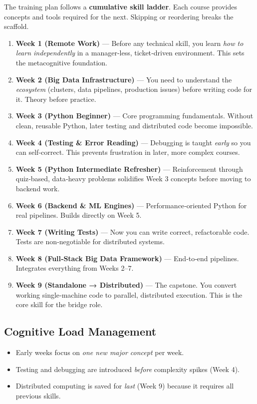 \documentclass[12pt]{article}
\begin{document}
	The training plan follows a \textbf{cumulative skill ladder}. Each course provides concepts and tools required for the next. Skipping or reordering breaks the scaffold.
	
	\begin{enumerate}
		\item \textbf{Week 1 (Remote Work)} — Before any technical skill, you learn \emph{how to learn independently} in a manager‑less, ticket‑driven environment. This sets the metacognitive foundation.
		
		\item \textbf{Week 2 (Big Data Infrastructure)} — You need to understand the \emph{ecosystem} (clusters, data pipelines, production issues) before writing code for it. Theory before practice.
		
		\item \textbf{Week 3 (Python Beginner)} — Core programming fundamentals. Without clean, reusable Python, later testing and distributed code become impossible.
		
		\item \textbf{Week 4 (Testing \& Error Reading)} — Debugging is taught \emph{early} so you can self‑correct. This prevents frustration in later, more complex courses.
		
		\item \textbf{Week 5 (Python Intermediate Refresher)} — Reinforcement through quiz‑based, data‑heavy problems solidifies Week 3 concepts before moving to backend work.
		
		\item \textbf{Week 6 (Backend \& ML Engines)} — Performance‑oriented Python for real pipelines. Builds directly on Week 5.
		
		\item \textbf{Week 7 (Writing Tests)} — Now you can write correct, refactorable code. Tests are non‑negotiable for distributed systems.
		
		\item \textbf{Week 8 (Full‑Stack Big Data Framework)} — End‑to‑end pipelines. Integrates everything from Weeks 2–7.
		
		\item \textbf{Week 9 (Standalone → Distributed)} — The capstone. You convert working single‑machine code to parallel, distributed execution. This is the core skill for the bridge role.
	\end{enumerate}
	
	\subsection*{Cognitive Load Management}
	\begin{itemize}
		\item Early weeks focus on \emph{one new major concept} per week.
		\item Testing and debugging are introduced \emph{before} complexity spikes (Week 4).
		\item Distributed computing is saved for \emph{last} (Week 9) because it requires all previous skills.
	\end{itemize}
	
\end{document}

